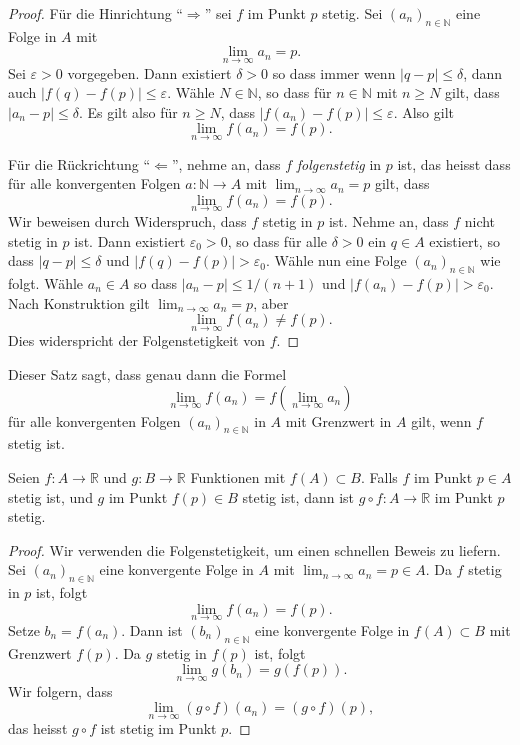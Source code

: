 \documentclass[../main.tex]{subfiles}
\begin{document}
\begin{proof}
  Für die Hinrichtung ``$\Rightarrow$'' sei $f$
  im Punkt $p$ stetig. Sei ${(a_{n})}_{n \in \mathbb{N}}$ 
  eine Folge in $A$ mit
  \[
    \lim_{n \to \infty} a_n = p.
  \]
  Sei $\varepsilon > 0$ vorgegeben.
  Dann existiert $\delta > 0$ so dass immer wenn
  $|q - p| \leq \delta$, dann auch
  $|f(q) - f(p)| \leq \varepsilon$.
  Wähle $N \in \mathbb{N}$, so
  dass für $n \in \mathbb{N}$ mit $n \geq N$ gilt,
  dass $|a_n - p| \leq \delta$.
  Es gilt also für $n \geq N$, dass
  $|f(a_n) - f(p)| \leq \varepsilon$.
  Also gilt
  \[
    \lim_{n \to \infty} f(a_n) = f(p).
  \]
  
  Für die Rückrichtung ``$\Leftarrow$'', nehme an,
  dass $f$ \emph{folgenstetig} in $p$ ist,
  das heisst dass für alle
  konvergenten Folgen $a \colon \mathbb{N} \to A$
  mit $\lim_{n \to \infty} a_n = p$ gilt,
  dass
  \[
    \lim_{n \to \infty} f(a_n) = f(p).
  \]
  Wir beweisen durch Widerspruch, dass
  $f$ stetig in $p$ ist.
  Nehme an, dass $f$ nicht stetig in $p$ ist.
  Dann existiert $\varepsilon_0 > 0$, so dass
  für alle $\delta > 0$ ein $q \in A$ 
  existiert, so dass
  $|q - p| \leq \delta$ und $|f(q) - f(p)| > \varepsilon_0$.
  Wähle nun eine Folge
  ${(a_{n})}_{n \in \mathbb{N}}$ wie folgt.
  Wähle $a_n \in A$ so dass
  $|a_n - p| \leq 1/(n+1)$ und $|f(a_n) - f(p)| > \varepsilon_0$.
  Nach Konstruktion gilt
  $\lim_{n \to \infty} a_n = p$, aber
  \[
    \lim_{n \to \infty} f(a_n) \neq f(p).
  \]
  Dies widerspricht der Folgenstetigkeit von $f$.
\end{proof}

Dieser Satz sagt, dass genau dann die Formel
\[
  \lim_{n \to \infty}  f(a_n) = f\left(\lim_{n \to \infty} a_n\right)
\]
für alle konvergenten Folgen ${(a_{n})}_{n \in \mathbb{N}}$ in $A$
mit Grenzwert in $A$
gilt, wenn $f$ stetig ist.

\begin{application}
  Seien $f \colon A \to \mathbb{R}$ und $g \colon B \to \mathbb{R}$
  Funktionen mit $f(A) \subset B$. Falls $f$ im Punkt $p \in A$ 
  stetig ist, und $g$ im Punkt $f(p) \in B$ stetig ist,
  dann ist $g \circ f\colon A \to \mathbb{R}$ im Punkt $p$ stetig.
\end{application}

\begin{proof}
  Wir verwenden die Folgenstetigkeit, um einen schnellen
  Beweis zu liefern.
  Sei  ${(a_{n})}_{n \in \mathbb{N}}$ eine konvergente
  Folge in $A$ mit $\lim_{n \to \infty} a_n = p \in A$.
  Da $f$ stetig in $p$ ist, folgt
  \[
    \lim_{n \to \infty}f(a_n) = f(p).
  \]
  Setze $b_n = f(a_n)$. Dann ist ${(b_{n})}_{n \in \mathbb{N}}$ 
  eine konvergente Folge in $f(A) \subset B$ mit Grenzwert
  $f(p)$.
  Da $g$ stetig in $f(p)$ ist, folgt
  \[
    \lim_{n \to \infty} g(b_n) = g(f(p)).
  \]
  Wir folgern, dass
  \[
    \lim_{n \to \infty} (g \circ f)(a_n) = (g \circ f)(p),
  \]
  das heisst $g \circ f$ ist stetig im Punkt $p$.
\end{proof}
\end{document}
